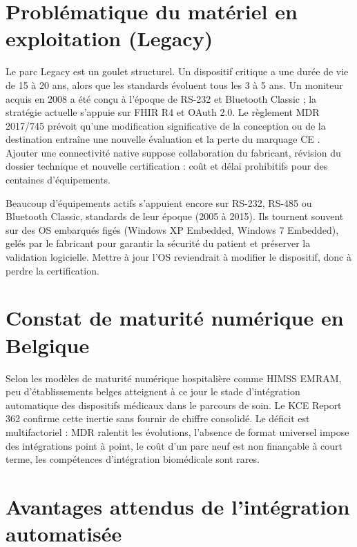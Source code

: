 \section{Problématique du matériel en exploitation (Legacy)}
\label{sec:ehealth-legacy}

Le parc Legacy est un goulet structurel. Un dispositif critique a une durée de vie de 15 à 20 ans, alors que les standards évoluent tous les 3 à 5 ans. Un moniteur acquis en 2008 a été conçu à l'époque de RS-232 et Bluetooth Classic ; la stratégie actuelle s'appuie sur FHIR R4 et OAuth 2.0. Le règlement MDR 2017/745 prévoit qu'une modification significative de la conception ou de la destination entraîne une nouvelle évaluation et la perte du marquage CE \cite{mdr_2017_745}. Ajouter une connectivité native suppose collaboration du fabricant, révision du dossier technique et nouvelle certification : coût et délai prohibitifs pour des centaines d'équipements.

\begin{bridgewarn}
Beaucoup d'équipements actifs s'appuient encore sur RS-232, RS-485 ou Bluetooth Classic, standards de leur époque (2005 à 2015). Ils tournent souvent sur des OS embarqués figés (Windows XP Embedded, Windows 7 Embedded), gelés par le fabricant pour garantir la sécurité du patient et préserver la validation logicielle. Mettre à jour l'OS reviendrait à modifier le dispositif, donc à perdre la certification.
\end{bridgewarn}

\section{Constat de maturité numérique en Belgique}
\label{sec:ehealth-maturite}

Selon les modèles de maturité numérique hospitalière comme HIMSS EMRAM, peu d'établissements belges atteignent à ce jour le stade d'intégration automatique des dispositifs médicaux dans le parcours de soin. Le KCE Report 362 \cite{kce_362_dpi} confirme cette inertie sans fournir de chiffre consolidé. Le déficit est multifactoriel : MDR ralentit les évolutions, l'absence de format universel impose des intégrations point à point, le coût d'un parc neuf est non finançable à court terme, les compétences d'intégration biomédicale sont rares.

\section{Avantages attendus de l'intégration automatisée}
\label{sec:avantages-attendus}

